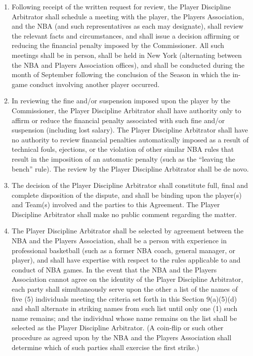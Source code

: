 \documentclass[
]{book}
\providecommand{\tightlist}{%
  \setlength{\itemsep}{0pt}\setlength{\parskip}{0pt}}
\begin{document}
\begin{enumerate}
\begin{enumerate}
    \begin{enumerate}
    \def\labelenumiii{(\alph{enumiii})}
    \tightlist
    \item
      Following receipt of the written request for review, the Player Discipline Arbitrator shall schedule a meeting with the player, the Players Association, and the NBA (and such representatives as each may designate), shall review the relevant facts and circumstances, and shall issue a decision affirming or reducing the financial penalty imposed by the Commissioner. All such meetings shall be in person, shall be held in New York (alternating between the NBA and Players Association offices), and shall be conducted during the month of September following the conclusion of the Season in which the in-game conduct involving another player occurred.
    \item
      In reviewing the fine and/or suspension imposed upon the player by the Commissioner, the Player Discipline Arbitrator shall have authority only to affirm or reduce the financial penalty associated with such fine and/or suspension (including lost salary). The Player Discipline Arbitrator shall have no authority to review financial penalties automatically imposed as a result of technical fouls, ejections, or the violation of other similar NBA rules that result in the imposition of an automatic penalty (such as the ``leaving the bench'' rule). The review by the Player Discipline Arbitrator shall be de novo.
    \item
      The decision of the Player Discipline Arbitrator shall constitute full, final and complete disposition of the dispute, and shall be binding upon the player(s) and Team(s) involved and the parties to this Agreement. The Player Discipline Arbitrator shall make no public comment regarding the matter.
    \item
      The Player Discipline Arbitrator shall be selected by agreement between the NBA and the Players Association, shall be a person with experience in professional basketball (such as a former NBA coach, general manager, or player), and shall have expertise with respect to the rules applicable to and conduct of NBA games. In the event that the NBA and the Players Association cannot agree on the identity of the Player Discipline Arbitrator, each party shall simultaneously serve upon the other a list of the names of five (5) individuals meeting the criteria set forth in this Section 9(a)(5)(d) and shall alternate in striking names from such list until only one (1) such name remains; and the individual whose name remains on the list shall be selected as the Player Discipline Arbitrator. (A coin-flip or such other procedure as agreed upon by the NBA and the Players Association shall determine which of such parties shall exercise the first strike.)

\end{enumerate}
\end{enumerate}
\end{enumerate}
\end{document}

